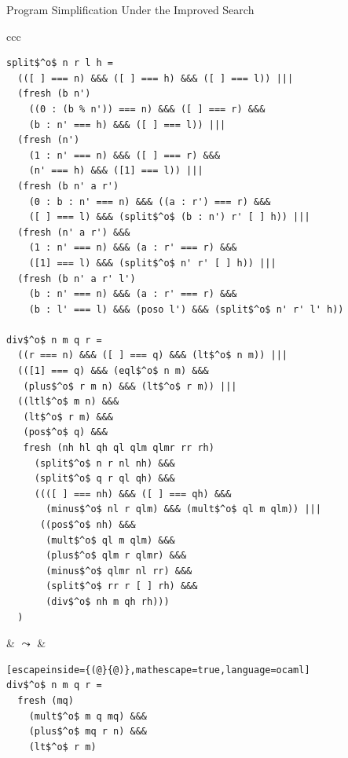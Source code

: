 \documentclass{beamer}
\theoremstyle{definition}
\theoremstyle{plain} %
\begin{document}
\begin{frame}[fragile]{Program Simplification Under the Improved Search}

\begin{center}
\begin{tabular}{ccc}
\newsavebox{\mybox}
\begin{lrbox}{\mybox}
    \begin{lstlisting}[basicstyle=\tiny]
split$^o$ n r l h =
  (([ ] === n) &&& ([ ] === h) &&& ([ ] === l)) |||
  (fresh (b n')
    ((0 : (b % n')) === n) &&& ([ ] === r) &&&
    (b : n' === h) &&& ([ ] === l)) |||
  (fresh (n')
    (1 : n' === n) &&& ([ ] === r) &&&
    (n' === h) &&& ([1] === l)) |||
  (fresh (b n' a r')
    (0 : b : n' === n) &&& ((a : r') === r) &&&
    ([ ] === l) &&& (split$^o$ (b : n') r' [ ] h)) |||
  (fresh (n' a r') &&&
    (1 : n' === n) &&& (a : r' === r) &&&
    ([1] === l) &&& (split$^o$ n' r' [ ] h)) |||
  (fresh (b n' a r' l')
    (b : n' === n) &&& (a : r' === r) &&&
    (b : l' === l) &&& (poso l') &&& (split$^o$ n' r' l' h))

div$^o$ n m q r =
  ((r === n) &&& ([ ] === q) &&& (lt$^o$ n m)) |||
  (([1] === q) &&& (eql$^o$ n m) &&&
   (plus$^o$ r m n) &&& (lt$^o$ r m)) |||
  ((ltl$^o$ m n) &&&
   (lt$^o$ r m) &&&
   (pos$^o$ q) &&&
   fresh (nh hl qh ql qlm qlmr rr rh)
     (split$^o$ n r nl nh) &&&
     (split$^o$ q r ql qh) &&&
     ((([ ] === nh) &&& ([ ] === qh) &&&
       (minus$^o$ nl r qlm) &&& (mult$^o$ ql m qlm)) |||
      ((pos$^o$ nh) &&&
       (mult$^o$ ql m qlm) &&&
       (plus$^o$ qlm r qlmr) &&&
       (minus$^o$ qlmr nl rr) &&&
       (split$^o$ rr r [ ] rh) &&&
       (div$^o$ nh m qh rh)))
  )
    \end{lstlisting}
\end{lrbox}

\scalebox{0.75}{\usebox{\mybox}}

&
$\leadsto$
&
\begin{minipage}{.3\textwidth}
\begin{lstlisting}[escapeinside={(@}{@)},mathescape=true,language=ocaml]
div$^o$ n m q r =
  fresh (mq)
    (mult$^o$ m q mq) &&&
    (plus$^o$ mq r n) &&&
    (lt$^o$ r m)
\end{lstlisting}
\end{minipage}

\end{tabular}
\end{center}

\end{frame}
\end{document}
